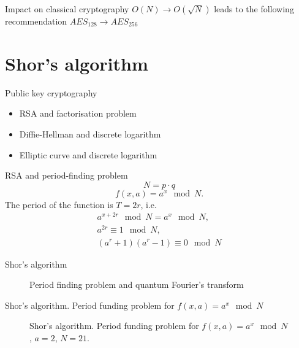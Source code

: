 \documentclass[10pt,pdf,hyperref={unicode}]{beamer}
\begin{document}
\begin{frame}{Impact on classical cryptography}
  $O(N) \rightarrow O(\sqrt{N})$
  leads to the following recommendation 
  $AES_{128} \rightarrow AES_{256}$
\end{frame}


\section{Shor's algorithm}
\begin{frame}{Public key cryptography}
\begin{itemize}
\item RSA and factorisation problem 
\item Diffie-Hellman and discrete logarithm
\item Elliptic curve and discrete logarithm
\end{itemize}
\end{frame}

\begin{frame}{RSA and period-finding problem}
\[
N = p \cdot q
\]
\[
f\left(x, a\right) = a^x \mod N.
\]
The period of the function is $T = 2r$, i.e.
\begin{eqnarray}
a^{x+2r} \mod N = a^x \mod N,
\nonumber \\
a^{2r} \equiv 1 \mod N,
\nonumber \\
(a^r + 1)(a^r - 1)  \equiv 0 \mod N
\nonumber
\end{eqnarray}
\end{frame}

\begin{frame}{Shor's algorithm}
\begin{figure}
\centering

\scalebox{.8}{}

\caption{ Period finding problem and quantum Fourier's transform}
\end{figure}
\end{frame}


\begin{frame}{Shor's algorithm. Period funding problem for 
  $f\left(x, a\right) = a^x \mod{N}$}
\begin{figure}
\centering

\scalebox{.65}{}

\caption{Shor's algorithm. Period funding problem for 
  $f\left(x, a\right) = a^x \mod{N}$, $a=2$, $N = 21$.}
\end{figure}
\end{frame}
\end{document}

